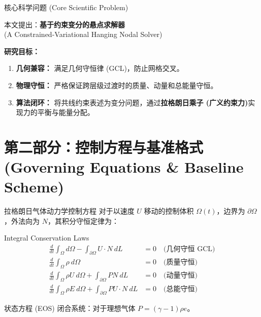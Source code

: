 \documentclass{beamer}
\begin{document}
	\begin{frame}{核心科学问题 (Core Scientific Problem)}
		\begin{center}
			\large 本文提出：\textbf{基于约束变分的悬点求解器} \\
			\normalsize (A Constrained-Variational Hanging Nodal Solver)
		\end{center}
		\vspace{0.3cm}
		\textbf{研究目标：}
		\begin{enumerate}
			\item \textbf{几何兼容：} 满足几何守恒律 (GCL)，防止网格交叉。
			\item \textbf{物理守恒：} 严格保证跨层级过渡时的质量、动量和总能量守恒。
			\item \textbf{算法闭环：} 将共线约束表述为变分问题，通过\textbf{拉格朗日乘子 (广义约束力)}实现力的平衡与能量分配。
		\end{enumerate}
	\end{frame}
	
	\section{第二部分：控制方程与基准格式 (Governing Equations \& Baseline Scheme)}
	
	\begin{frame}{拉格朗日气体动力学控制方程}
		对于以速度 $U$ 移动的控制体积 $\Omega(t)$，边界为 $\partial\Omega$，外法向为 $N$，其积分守恒定律为：
		
		\begin{block}{Integral Conservation Laws}
			\begin{align*}
				\frac{d}{dt}\int_{\Omega}d\Omega - \int_{\partial\Omega}U\cdot N~dL &= 0 \quad \text{(几何守恒 GCL)} \\
				\frac{d}{dt}\int_{\Omega}\rho~d\Omega &= 0 \quad \text{(质量守恒)} \\
				\frac{d}{dt}\int_{\Omega}\rho U~d\Omega + \int_{\partial\Omega}PN~dL &= 0 \quad \text{(动量守恒)} \\
				\frac{d}{dt}\int_{\Omega}\rho E~d\Omega + \int_{\partial\Omega}PU\cdot N~dL &= 0 \quad \text{(总能守恒)}
			\end{align*}
		\end{block}
		
		状态方程 (EOS) 闭合系统：对于理想气体 $P = (\gamma-1)\rho e$。
	\end{frame}
	
\end{document}
